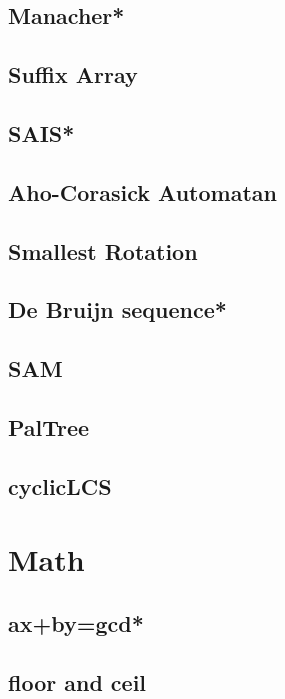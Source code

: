 \subsection{Manacher*} %

\subsection{Suffix Array}

\subsection{SAIS*}

\subsection{Aho-Corasick Automatan}

\subsection{Smallest Rotation}

\subsection{De Bruijn sequence*} %

\subsection{SAM}

\subsection{PalTree}

\subsection{cyclicLCS}



\section{Math}
\subsection{ax+by=gcd*} %

\subsection{floor and ceil}

